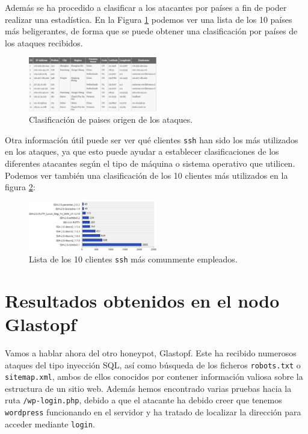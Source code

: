 \documentclass[journal]{IEEEtran}
\begin{document}
Además se ha procedido a clasificar a los atacantes por países a fin de poder realizar una estadística. En la Figura \ref{fig:country_profiling} podemos ver una lista de los 10 países más beligerantes, de forma que se puede obtener una clasificación por países de los ataques recibidos.

\begin{figure}[H]
\centering
\includegraphics[width=0.5\textwidth]{img/country_profiling}
\caption{Clasificación de paises origen de los ataques.}
\label{fig:country_profiling}
\end{figure}

Otra información útil puede ser ver qué clientes {\tt ssh} han sido los más utilizados en los ataques, ya que esto puede ayudar a establecer clasificaciones de los diferentes atacantes según el tipo de máquina o sistema operativo que utilicen. Podemos ver también una clasificación de los 10 clientes más utilizados en la figura \ref{fig:ssh}:

\begin{figure}[H]
\centering
\includegraphics[width=0.5\textwidth]{img/ssh}
\caption{Lista de los 10 clientes {\tt ssh} más comunmente empleados.}
\label{fig:ssh}
\end{figure}


\section{Resultados obtenidos en el nodo Glastopf}

Vamos a hablar ahora del otro honeypot, Glastopf. Este ha recibido numerosos ataques del tipo inyección SQL, así como búsqueda de los ficheros {\tt robots.txt} o {\tt sitemap.xml}, ambos de ellos conocidos por contener información valiosa sobre la estructura de un sitio web. Además hemos encontrado varias pruebas hacia la ruta {\tt /wp-login.php}, debido a que el atacante ha debido creer que tenemos {\tt wordpress} funcionando en el servidor y ha tratado de localizar la dirección para acceder mediante {\tt login}.
\end{document}
